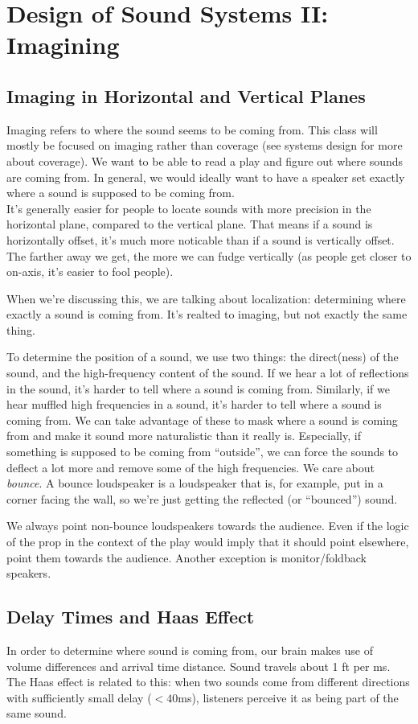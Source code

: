 \documentclass[a4paper]{article}
\begin{document}
\section{Design of Sound Systems II: Imagining}
\subsection{Imaging in Horizontal and Vertical Planes}
Imaging refers to where the sound seems to be coming from. This class will
mostly be focused on imaging rather than coverage (see systems design for more
about coverage). We want to be able to read a play and figure out where sounds
are coming from. In general, we would ideally want to have a speaker set
exactly where a sound is supposed to be coming from.\\
It's generally easier for people to locate sounds with more precision in the
horizontal plane, compared to the vertical plane. That means if a sound is
horizontally offset, it's much more noticable than if a sound is vertically
offset. The farther away we get, the more we can fudge vertically (as people
get closer to on-axis, it's easier to fool people).

When we're discussing this, we are talking about localization: determining
where exactly a sound is coming from. It's realted to imaging, but not exactly
the same thing.

To determine the position of a sound, we use two things: the direct(ness) of
the sound, and the high-frequency content of the sound. If we hear a lot of
reflections in the sound, it's harder to tell where a sound is coming from.
Similarly, if we hear muffled high frequencies in a sound, it's harder to tell
where a sound is coming from. We can take advantage of these to mask where a
sound is coming from and make it sound more naturalistic than it really is.
Especially, if something is supposed to be coming from ``outside'', we can
force the sounds to deflect a lot more and remove some of the high frequencies.
We care about \emph{bounce}. A bounce loudspeaker is a loudspeaker that is, for
example, put in a corner facing the wall, so we're just getting the reflected
(or ``bounced'') sound.

We always point non-bounce loudspeakers towards the audience. Even if the logic
of the prop in the context of the play would imply that it should point
elsewhere, point them towards the audience. Another exception is
monitor/foldback speakers.

\subsection{Delay Times and Haas Effect}
In order to determine where sound is coming from, our brain makes use of volume
differences and arrival time distance. Sound travels about 1 ft per ms.
The Haas effect is related to this: when
two sounds come from different directions with sufficiently small delay ($<
40$ms), listeners perceive it as being part of the same sound.
\end{document}
